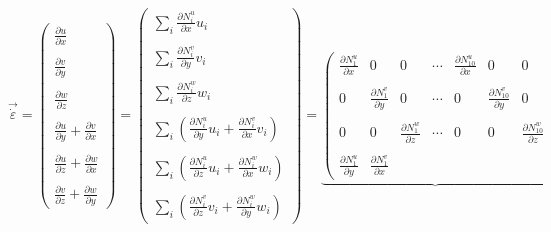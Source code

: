 \begin{equation}
\vec{\dot\varepsilon}=
\left(
\begin{array}{c}
\frac{\partial u}{\partial x} \\ \\
\frac{\partial v}{\partial y} \\ \\
\frac{\partial w}{\partial z} \\ \\
\frac{\partial u}{\partial y}\! +\! \frac{\partial v}{\partial x} \\ \\
\frac{\partial u}{\partial z}\! +\! \frac{\partial w}{\partial x} \\ \\
\frac{\partial v}{\partial z}\! +\! \frac{\partial w}{\partial y} 
\end{array}
\right)
=
\left(
\begin{array}{c}
\sum\limits_i \frac{\partial N_i^u}{\partial x} u_i \\ \\
\sum\limits_i \frac{\partial N_i^v}{\partial y} v_i \\ \\
\sum\limits_i \frac{\partial N_i^w}{\partial z} w_i \\ \\
\sum\limits_i (\frac{\partial N_i^u}{\partial y} u_i\! +\! \frac{\partial N_i^v}{\partial x} v_i) \\ \\
\sum\limits_i (\frac{\partial N_i^u}{\partial z} u_i\! +\! \frac{\partial N_i^w}{\partial x} w_i) \\ \\
\sum\limits_i (\frac{\partial N_i^v}{\partial z} v_i\! +\! \frac{\partial N_i^w}{\partial y} w_i) 
\end{array}
\right)
=
\underbrace{
\left(
\begin{array}{ccccccccccc}
\frac{\partial N_1^u}{\partial x} & 0 & 0 &  \cdots  & \frac{\partial N_{10}^u}{\partial x} & 0 & 0 \\ \\
0 & \frac{\partial N_1^v}{\partial y} & 0 & \cdots & 0 & \frac{\partial N_{10}^v}{\partial y} & 0 \\ \\
0 & 0 & \frac{\partial N_1^w}{\partial z} & \cdots & 0 & 0 & \frac{\partial N_{10}^w}{\partial z}
\\ \\
\frac{\partial N_1^u}{\partial y} &  \frac{\partial N_1^v}{\partial x} &  

\end{array}}
\end{equation}
